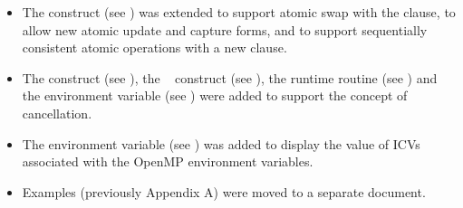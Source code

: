 \begin{itemize}
\item The  construct (see
) was extended to support
atomic swap with the  clause, to allow new atomic update and capture
forms, and to support sequentially consistent atomic operations with a new 
clause.

\item The  construct (see
), the ~ construct (see
),
the 
runtime routine (see
)
and the 
environment variable (see
) were added to support the
concept of cancellation.

\item The  environment variable (see
) was
added to display the value of ICVs associated with the OpenMP environment
variables.

\item Examples (previously Appendix A) were moved to a separate document.
\end{itemize}






